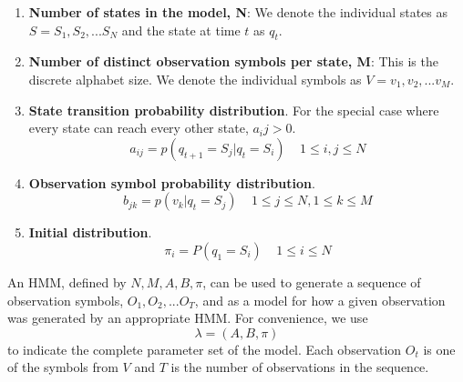 \documentclass{article}
\begin{document}
						
\begin{enumerate}
\item \textbf{Number of states in the model, N}: We denote the individual states as $S={S_1, S_2, ... S_N}$ and the state at time $t$ as $q_t$.
\item \textbf{Number of distinct observation symbols per state, M}: This is the discrete alphabet size.    We denote the individual symbols as $V={v_1, v_2, ... v_M}$.
\item \textbf{State transition probability distribution}.  For the special case where every state can reach every other state, $a_ij>0$.
\begin{equation}
a_{ij} = p(q_{t+1}=S_j|q_t=S_i)  \ \ \ \ \ 1 \leq i, j \leq N
\end{equation}
\item \textbf{Observation symbol probability distribution}. 
\begin{equation}
b_{jk} = p(v_k|q_t=S_j)  \ \ \ \ \ 1 \leq j \leq N,  1 \leq k \leq M
\end{equation}
\item \textbf{Initial distribution}.
\begin{equation}
\pi_i	= P(q_1=S_i) \ \ \ \ \ 1 \leq i \leq N
\end{equation}
\end{enumerate}

An HMM, defined by $N, M, A, B, \pi$, can be used to generate a sequence of observation symbols, $O_1, O_2, ... 	O_T$, and as a model for how a given observation was generated by an appropriate HMM.  For convenience, we use
\begin{equation}
\lambda = (A, B, \pi)
\end{equation}
to indicate the complete parameter set of the model.  Each observation $O_t$ is one of the symbols from $V$ and $T$ is the number of observations in the sequence.  
\end{document}
